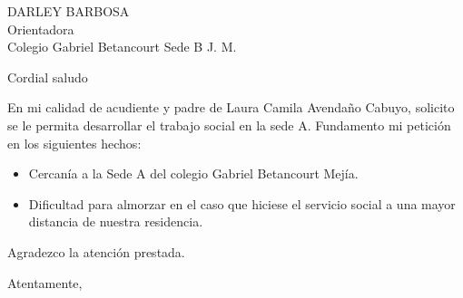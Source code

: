 \documentclass[letterpaper,spanish,11pt]{letter}
\begin{document}
\begin{letter}{DARLEY BARBOSA\\Orientadora\\Colegio Gabriel Betancourt Sede B J. M.}
	
\opening{Cordial saludo}
En mi calidad de acudiente y padre de Laura Camila Avendaño Cabuyo, solicito se le permita desarrollar el trabajo social en la sede A. Fundamento mi petición en los siguientes hechos:
\begin{itemize}
\item Cercan\'{i}a a la Sede A del colegio Gabriel Betancourt Mej\'{i}a.
\item Dificultad para almorzar en el caso que hiciese el servicio social a una mayor distancia de nuestra residencia.
\end{itemize}
Agradezco la atenci\'{o}n prestada.
\closing{Atentamente,}


\end{letter}
\end{document}

